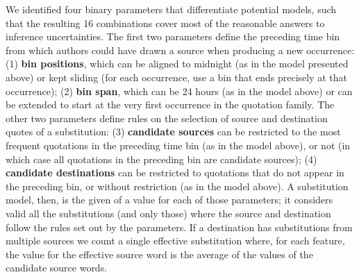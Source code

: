 \begin{new}

We identified four binary parameters that differentiate potential models, such that the resulting 16 combinations cover most of the reasonable answers to inference uncertainties.
The first two parameters define the preceding time bin from which authors could have drawn a source when producing a new occurrence:
(1) \textbf{bin positions}, which can be aligned to midnight (as in the model presented above) or kept sliding (for each occurrence, use a bin that ends precisely at that occurrence);
(2) \textbf{bin span}, which can be 24 hours (as in the model above) or can be extended to start at the very first occurrence in the quotation family.
The other two parameters define rules on the selection of source and destination quotes of a substitution:
(3) \textbf{candidate sources} can be restricted to the most frequent quotations in the preceding time bin (as in the model above), or not (in which case all quotations in the preceding bin are candidate sources);
(4) \textbf{candidate destinations} can be restricted to quotations that do not appear in the preceding bin, or without restriction (as in the model above).
A substitution model, then, is the given of a value for each of those parameters;
it considers valid all the substitutions (and only those) where the source and destination follow the rules set out by the parameters.
If a destination has substitutions from multiple sources we count a single effective substitution where, for each feature, the value for the effective source word is the average of the values of the candidate source words.

\end{new}
